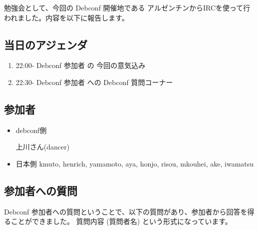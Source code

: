 \documentclass[mingoth,a4paper]{jsarticle}
\begin{document}
勉強会として、今回の Debconf 開催地である アルゼンチンからIRCを使って行われました。内容を以下に報告します。

\subsection{当日のアジェンダ}
\begin{enumerate}
\item 22:00-  Debconf 参加者 の 今回の意気込み
\item 22:30-  Debconf 参加者 への Debconf 質問コーナー
\end{enumerate}

\subsection{参加者}
\begin{itemize}
\item debconf側

 上川さん(dancer)

\item 日本側
kmuto, henrich, yamamoto, aya, honjo, risou, mkouhei, ake, iwamatsu
\end{itemize}

\subsection{参加者への質問}
Debconf 参加者への質問ということで、以下の質問があり、参加者から回答を得ることができました。
質問内容 (質問者名) という形式になっています。
\end{document}
